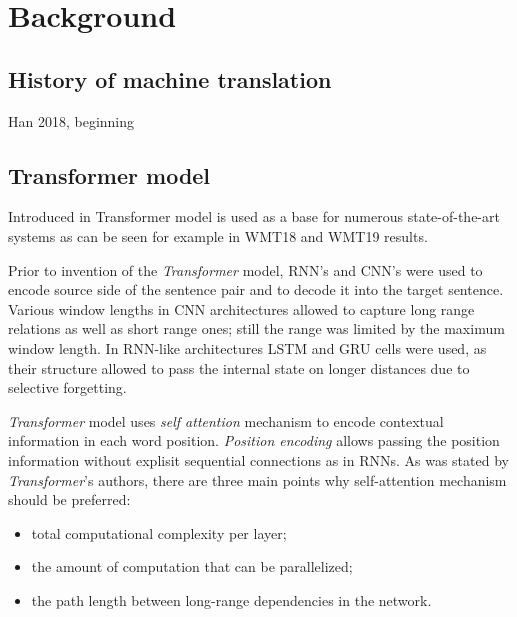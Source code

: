 \chapter{Background}

\section{History of machine translation}

Han 2018, beginning

\section{Transformer model}

Introduced in  Transformer model is used as a base
for numerous state-of-the-art systems as can be seen for example in 
WMT18  and
WMT19  results.

Prior to invention of the \textit{Transformer} model, RNN's and CNN's were used
to encode source side of the sentence pair and to decode it into the target sentence.
Various window lengths in CNN architectures allowed to capture long range relations
as well as short range ones; still the range was limited by the maximum window length.
In RNN-like architectures LSTM and GRU cells were used, as their structure allowed to
pass the internal state on longer distances due to selective forgetting.

\textit{Transformer} model uses \textit{self attention} mechanism to encode contextual
information in each word position. \textit{Position encoding} allows passing the position
information without explisit sequential connections as in RNNs.
As was stated by \textit{Transformer}'s authors, there are three main points why
self-attention mechanism should be preferred:
\begin{itemize}
  \item total computational complexity per layer;
  \item the amount of computation that can be parallelized;
  \item the path length between long-range dependencies in the network.
\end{itemize}

